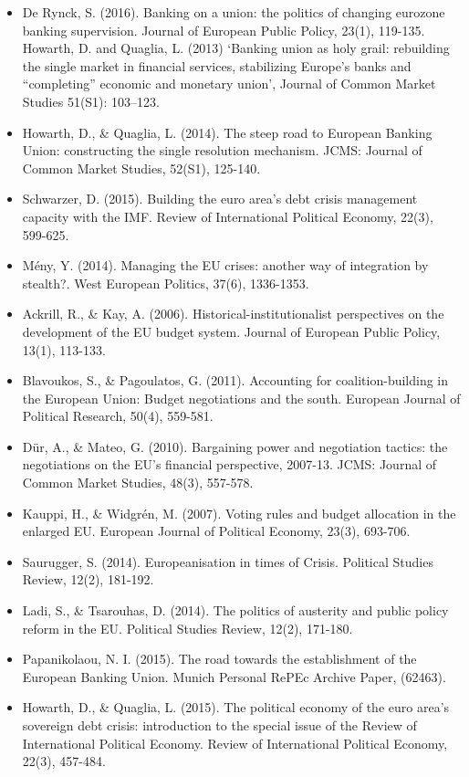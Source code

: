 \begin{itemize}
	\item De Rynck, S. (2016). Banking on a union: the politics of changing eurozone banking supervision. Journal of European Public Policy, 23(1), 119-135.
	Howarth, D. and Quaglia, L. (2013) ‘Banking union as holy grail: rebuilding the single market in financial services, stabilizing Europe's banks and “completing” economic and monetary union’, Journal of Common Market Studies 51(S1): 103–123. 
	\item Howarth, D., \& Quaglia, L. (2014). The steep road to European Banking Union: constructing the single resolution mechanism. JCMS: Journal of Common Market Studies, 52(S1), 125-140.
	\item Schwarzer, D. (2015). Building the euro area's debt crisis management capacity with the IMF. Review of International Political Economy, 22(3), 599-625.
	\item Mény, Y. (2014). Managing the EU crises: another way of integration by stealth?. West European Politics, 37(6), 1336-1353.
	\item Ackrill, R., \& Kay, A. (2006). Historical-institutionalist perspectives on the development of the EU budget system. Journal of European Public Policy, 13(1), 113-133.
	\item Blavoukos, S., \& Pagoulatos, G. (2011). Accounting for coalition-building in the European Union: Budget negotiations and the south. European Journal of Political Research, 50(4), 559-581.
	\item D{\"u}r, A., \& Mateo, G. (2010). Bargaining power and negotiation tactics: the negotiations on the EU's financial perspective, 2007-13. JCMS: Journal of Common Market Studies, 48(3), 557-578.
	\item Kauppi, H., \& Widgrén, M. (2007). Voting rules and budget allocation in the enlarged EU. European Journal of Political Economy, 23(3), 693-706.
	\item Saurugger, S. (2014). Europeanisation in times of Crisis. Political Studies Review, 12(2), 181-192.
	\item Ladi, S., \& Tsarouhas, D. (2014). The politics of austerity and public policy reform in the EU. Political Studies Review, 12(2), 171-180.
	\item Papanikolaou, N. I. (2015). The road towards the establishment of the European Banking Union. Munich Personal RePEc Archive Paper, (62463).
	\item Howarth, D., \& Quaglia, L. (2015). The political economy of the euro area's sovereign debt crisis: introduction to the special issue of the Review of International Political Economy. Review of International Political Economy, 22(3), 457-484.

\end{itemize}
